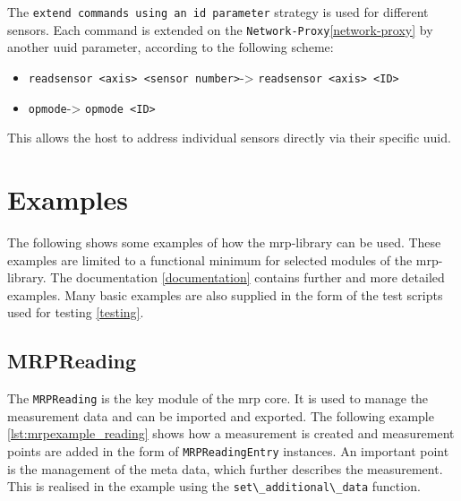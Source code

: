 The \passthrough{\lstinline!extend commands using an id parameter!}
strategy is used for different sensors. Each command is extended on the
\passthrough{\lstinline!Network-Proxy!}\ref{network-proxy} by another
\gls{uuid} parameter, according to the following scheme:

\begin{itemize}
\tightlist
\item
  \passthrough{\lstinline!readsensor <axis> <sensor number>!}-\textgreater{}
  \passthrough{\lstinline!readsensor <axis> <ID>!}
\item
  \passthrough{\lstinline!opmode!}-\textgreater{}
  \passthrough{\lstinline!opmode <ID>!}
\end{itemize}

This allows the host to address individual sensors directly via their
specific \gls{uuid}.

\hypertarget{examples}{%
\section{Examples}\label{examples}}

The following shows some examples of how the \gls{mrp}-library can be
used. These examples are limited to a functional minimum for selected
modules of the \gls{mrp}-library. The documentation \ref{documentation}
contains further and more detailed examples. Many basic examples are
also supplied in the form of the test scripts used for testing
\ref{testing}.

\hypertarget{mrpreading}{%
\subsection{MRPReading}\label{mrpreading}}

The \passthrough{\lstinline!MRPReading!} is the key module of the
\gls{mrp} core. It is used to manage the measurement data and can be
imported and exported. The following example
\ref{lst:mrpexample_reading} shows how a measurement is created and
measurement points are added in the form of
\passthrough{\lstinline!MRPReadingEntry!} instances. An important point
is the management of the meta data, which further describes the
measurement. This is realised in the example using the
\passthrough{\lstinline!set\_additional\_data!} function.

